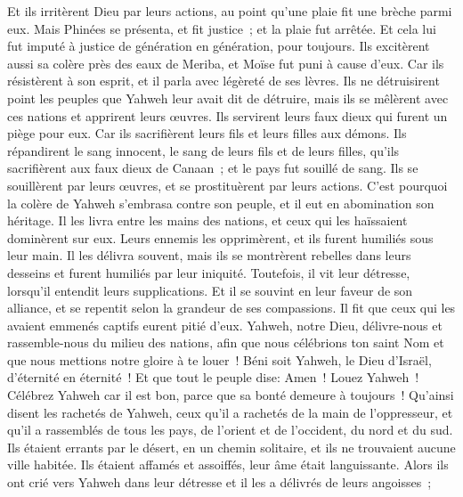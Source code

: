 \begin{multicols}{2}
Et ils irritèrent Dieu par leurs actions, au point qu'une plaie fit une brèche parmi eux.
Mais Phinées se présenta, et fit justice~; et la plaie fut arrêtée.
Et cela lui fut imputé à justice de génération en génération, pour toujours.
Ils excitèrent aussi sa colère près des eaux de Meriba, et Moïse fut puni à cause d'eux.
Car ils résistèrent à son esprit, et il parla avec légèreté de ses lèvres.
Ils ne détruisirent point les peuples que Yahweh leur avait dit de détruire,
mais ils se mêlèrent avec ces nations et apprirent leurs œuvres.
Ils servirent leurs faux dieux qui furent un piège pour eux.
Car ils sacrifièrent leurs fils et leurs filles aux démons.
Ils répandirent le sang innocent, le sang de leurs fils et de leurs filles, qu'ils sacrifièrent aux faux dieux de Canaan~; et le pays fut souillé de sang.
Ils se souillèrent par leurs œuvres, et se prostituèrent par leurs actions.
C'est pourquoi la colère de Yahweh s'embrasa contre son peuple, et il eut en abomination son héritage.
Il les livra entre les mains des nations, et ceux qui les haïssaient dominèrent sur eux.
Leurs ennemis les opprimèrent, et ils furent humiliés sous leur main.
Il les délivra souvent, mais ils se montrèrent rebelles dans leurs desseins et furent humiliés par leur iniquité.
Toutefois, il vit leur détresse, lorsqu'il entendit leurs supplications.
Et il se souvint en leur faveur de son alliance, et se repentit selon la grandeur de ses compassions.
Il fit que ceux qui les avaient emmenés captifs eurent pitié d'eux.
Yahweh, notre Dieu, délivre-nous et rassemble-nous du milieu des nations, afin que nous célébrions ton saint Nom et que nous mettions notre gloire à te louer~!
Béni soit Yahweh, le Dieu d'Israël, d'éternité en éternité~! Et que tout le peuple dise: Amen~! Louez Yahweh~!
\VerseOne{}Célébrez Yahweh car il est bon, parce que sa bonté demeure à toujours~!
Qu'ainsi disent les rachetés de Yahweh, ceux qu'il a rachetés de la main de l'oppresseur,
et qu'il a rassemblés de tous les pays, de l'orient et de l'occident, du nord et du sud.
Ils étaient errants par le désert, en un chemin solitaire, et ils ne trouvaient aucune ville habitée. 
Ils étaient affamés et assoiffés, leur âme était languissante.
Alors ils ont crié vers Yahweh dans leur détresse et il les a délivrés de leurs angoisses~;

\end{multicols}
